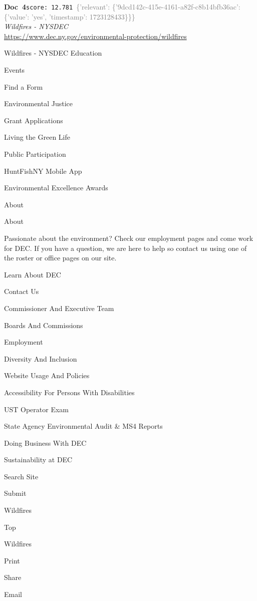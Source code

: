\documentclass[a4paper,11pt]{article}
\begin{document}
\begin{docenv}
{\footnotesize\textcolor{doccolor}{\textbf{Doc~4}}}\hfill{\tiny\texttt{score:~12.781}}\ {\tiny\textcolor{gray}{\{'relevant': \{'9dcd142c-415e-4161-a82f-c8b14bfb36ac': \{'value': 'yes', 'timestamp': 1723128433\}\}\}}}\\[3pt]
{\small\textit{Wildfires - NYSDEC}}\\[2pt]
{\tiny\url{https://www.dec.ny.gov/environmental-protection/wildfires}}\\[4pt]
{\footnotesize Wildfires - NYSDEC
Education

Events

Find a Form

Environmental Justice

Grant Applications

Living the Green Life

Public Participation

HuntFishNY Mobile App

Environmental Excellence Awards

About

About

Passionate about the environment? Check our employment pages and come work for DEC. If you have a question, we are here to help so contact us using one of the roster or office pages on our site. 

Learn About DEC

Contact Us

Commissioner And Executive Team

Boards And Commissions

Employment

Diversity And Inclusion

Website Usage And Policies

Accessibility For Persons With Disabilities

UST Operator Exam

State Agency Environmental Audit \& MS4 Reports

Doing Business With DEC

Sustainability at DEC

Search Site

Submit

Wildfires

Top

Wildfires

 Print
 

Share

Email

}
\end{docenv}
\end{document}
